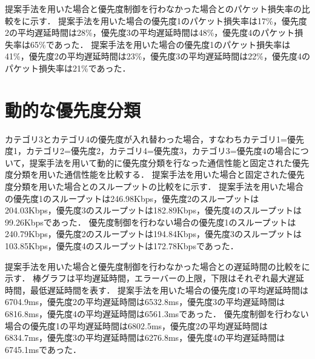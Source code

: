 \documentclass[a4paper,11pt,uplatex]{ujreport}
\begin{document}
  提案手法を用いた場合と優先度制御を行わなかった場合とのパケット損失率の比較をに示す．
  提案手法を用いた場合の優先度1のパケット損失率は17\%，優先度2の平均遅延時間は28\%，優先度3の平均遅延時間は48\%，優先度4のパケット損失率は65\%であった．
  提案手法を用いた場合の優先度1のパケット損失率は41\%，優先度2の平均遅延時間は23\%，優先度3の平均遅延時間は22\%，優先度4のパケット損失率は21\%であった．


\section{動的な優先度分類}
\label{sec:動的な優先度分類}

  カテゴリ3とカテゴリ4の優先度が入れ替わった場合，すなわちカテゴリ1=優先度1，カテゴリ2=優先度2，カテゴリ4=優先度3，カテゴリ3=優先度4の場合について，提案手法を用いて動的に優先度分類を行なった通信性能と固定された優先度分類を用いた通信性能を比較する．
  提案手法を用いた場合と固定された優先度分類を用いた場合とのスループットの比較をに示す．
  提案手法を用いた場合の優先度1のスループットは246.98Kbps，優先度2のスループットは204.03Kbps，優先度3のスループットは182.89Kbps，優先度4のスループットは99.26Kbpsであった．
  優先度制御を行わない場合の優先度1のスループットは240.79Kbps，優先度2のスループットは194.84Kbps，優先度3のスループットは103.85Kbps，優先度4のスループットは172.78Kbpsであった．


  提案手法を用いた場合と優先度制御を行わなかった場合との遅延時間の比較をに示す．
  棒グラフは平均遅延時間，エラーバーの上限，下限はそれぞれ最大遅延時間，最低遅延時間を表す．
  提案手法を用いた場合の優先度1の平均遅延時間は6704.9ms，優先度2の平均遅延時間は6532.8ms，優先度3の平均遅延時間は6816.8ms，優先度4の平均遅延時間は6561.3msであった．
  優先度制御を行わない場合の優先度1の平均遅延時間は6802.5ms，優先度2の平均遅延時間は6834.7ms，優先度3の平均遅延時間は6276.8ms，優先度4の平均遅延時間は6745.1msであった．
\end{document}
